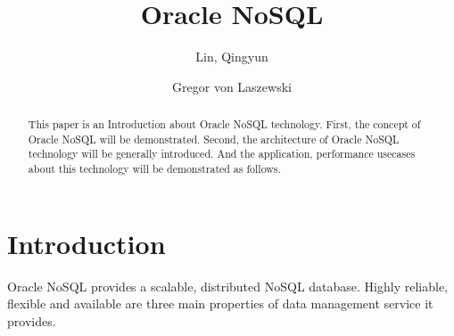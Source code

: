 
\title{Oracle NoSQL}


\author{Lin, Qingyun}

\author{Gregor von Laszewski}


\renewcommand{\shortauthors}{G. v. Laszewski}


\begin{abstract}
This paper is an Introduction about Oracle NoSQL technology. First, the concept of Oracle NoSQL will be demonstrated. Second, the architecture of Oracle NoSQL technology will be generally introduced. And the application, performance usecases about this technology will be demonstrated as follows.
\end{abstract}



\maketitle

\section{Introduction}

Oracle NoSQL provides a scalable, distributed NoSQL database. Highly reliable, flexible and available are three main properties of data management service it provides.

